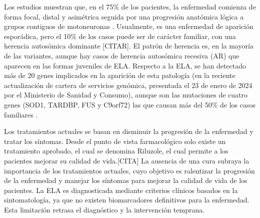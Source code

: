 Los estudios muestran que, en el 75\% de los pacientes, la enfermedad comienza de forma focal, distal y asimétrica seguida por una progresión anatómica lógica a grupos contiguos de motoneuronas \cite {rowland2001}. Usualmente, es una enfermedad de aparición esporádica, pero el 10\% de los casos puede ser de carácter familiar, con una herencia autosómica dominante [CITAR].  El patrón de herencia es, en la mayoría de las variantes, aunque hay casos de herencia autosómica recesiva (AR) que aparecen en las formas juveniles de ELA. 
Respecto a la ELA, se han detectado más de 20 genes implicados en la aparición de esta patología (en la reciente actualización de cartera de servicios genómica, presentada el 23 de enero de 2024 por el Ministerio de Sanidad y Consumo), aunque son las mutaciones de cuatro genes (SOD1, TARDBP, FUS y C9orf72) las que causan más del 50\% de los casos familiares \cite {dewan2021}. 

Los tratamientos actuales se basan en disminuir la progresión de la enfermedad y tratar los síntomas. Desde el punto de vista farmacológico solo existe un tratamiento aprobado, el cual se denomina Riluzole, el cual permite a los pacientes mejorar su calidad de vida.[CITA]
La ausencia de una cura subraya la importancia de los tratamientos actuales, cuyo objetivo es ralentizar la progresión de la enfermedad y manejar los síntomas para mejorar la calidad de vida de los pacientes. La ELA es diagnosticada mediante criterios clínicos basados en la sintomatología, ya que no existen biomarcadores definitivos para la enfermedad. Esta limitación retrasa el diagnóstico y la intervención temprana. 


